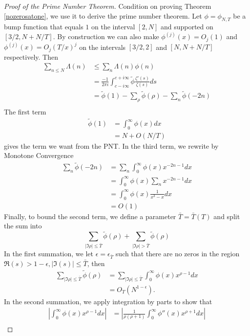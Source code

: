 \begin{proof}[Proof of the Prime Number Theorem]
    Condition on proving Theorem \ref{nozerosatone}, we use it to derive the prime number theorem.
Let $\phi=\phi_{N,T}$ be a bump function that equals $1$ on the interval $[2,N]$ and supported on $[3/2, N+N/T]$.
By construction we can also make $\phi^{(j)}(x)=O_j(1)$ and $\phi^{(j)}(x)=O_j(T/x)^j$ on the intervals $[3/2, 2]$ and $[N,N+N/T]$ respectively.
Then \begin{align*}
    \sum_{n\leq N}\Lambda(n) &\leq \sum_{n} \Lambda(n)\phi(n)\\
    &= \frac{-1}{2\pi i}\int_{c-i\infty}^{c+i\infty}\tilde{\phi}\frac{\zeta'(s)}{\zeta(s)}ds\\
    &= \tilde{\phi}(1) - \sum_{\rho} \tilde{\phi}(\rho) - \sum_{n} \tilde{\phi}(-2n)\\
\end{align*}
The first term \begin{align*}
    \tilde{\phi}(1) &= \int_{0}^{\infty} \phi(x) dx \\
    &= N+ O(N/T) 
\end{align*}
gives the term we want from the PNT. In the third term, we rewrite by Monotone Convergence \begin{align*}
    \sum_{n} \tilde{\phi}(-2n) &= \sum_{n} \int_{0}^{\infty} \phi(x) x^{-2n-1} dx \\
    &=\int_{0}^{\infty} \phi(x) \sum_{n} x^{-2n-1} dx \\
    &= \int_{0}^{\infty} \phi(x) \frac{1}{x^3-x} dx \\
    &= O(1)
\end{align*} 
Finally, to bound the second term, we define a parameter $\bar{T} = \bar{T}(T)$ and split the sum into\[
\sum_{|\Im{\rho}|\leq \bar{T}}\tilde{\phi}(\rho) + \sum_{|\Im{\rho}| > \bar{T}}\tilde{\phi}(\rho)
\]
In the first summation, we let $\epsilon = \epsilon_{\bar{T}}$ 
such that there are no zeros in the region
$\Re({s})>1-\epsilon, |\Im{(s)}|\leq \bar{T}$, then \begin{align*}
    \sum_{|\Im{\rho}|\leq \bar{T}}\tilde{\phi}(\rho) &= \sum_{|\Im{\rho}|\leq \bar{T}} \int_{0}^{\infty}\phi(x)x^{\rho-1}dx\\
    &= O_{T}(N^{1-\epsilon}).
\end{align*}
In the second summation, we apply integration by parts to show that \begin{align*}
    \left|\int_{0}^{\infty}\phi(x)x^{\rho-1}dx\right| &= \left|\frac{1}{\rho(\rho+1)}\int_{0}^{\infty}\phi''(x)x^{\rho+1}dx\right|\\

\end{align*}
\end{proof}
